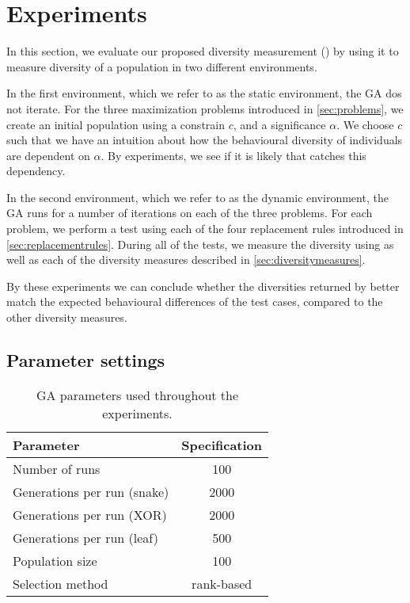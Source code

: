 \section{Experiments}\label{sec:experiments}
In this section, we evaluate our proposed diversity measurement (\dia) by using it to measure diversity of a population in two different environments.

In the first environment, which we refer to as the static environment, the GA dos not iterate.
For the three maximization problems introduced in \cref{sec:problems}, we create an initial population using a constrain $c$, and a significance $\alpha$. We choose $c$ such that we have an intuition about how the behavioural diversity of individuals are dependent on $\alpha$. By experiments, we see if it is likely that \dia{} catches this dependency.

In the second environment, which we refer to as the dynamic environment, the GA runs for a number of iterations on each of the three problems. 
For each problem, we perform a test using each of the four replacement rules introduced in \cref{sec:replacementrules}.
During all of the tests, we measure the diversity using \dia{} as well as each of the diversity measures described in \cref{sec:diversitymeasures}.

By these experiments we can conclude whether the diversities returned by \dia{} better match the expected behavioural differences of the test cases, compared to the other diversity measures.

\subsection{Parameter settings}

\begin{table}
  \centering
  \begin{tabular}{l S}
    \toprule
    Parameter & {Specification} \\
    \midrule
    Number of runs & 100 \\
    Generations per run (snake) & 2000 \\
    Generations per run (XOR) & 2000 \\
    Generations per run (leaf) & 500 \\
    Population size & 100 \\
    Selection method & {rank-based} \\
    \bottomrule
  \end{tabular}
  \caption{GA parameters used throughout the experiments.}
  \label{tab:gaparam}
\end{table}

